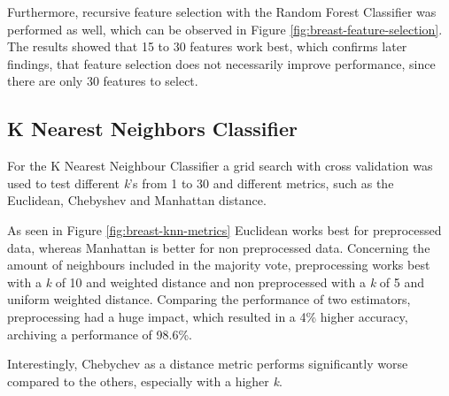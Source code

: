 

Furthermore, recursive feature selection with the Random Forest Classifier was performed as well, which can be observed in Figure \ref{fig:breast-feature-selection}. The results showed that 15 to 30 features work best, which confirms later findings, that feature selection does not necessarily improve performance, since there are only 30 features to select.


\subsection{K Nearest Neighbors Classifier}

For the K Nearest Neighbour Classifier a grid search with cross validation was used to test different \textit{k}'s from 1 to 30 and different metrics, such as the Euclidean, Chebyshev and Manhattan distance.

As seen in Figure \ref{fig:breast-knn-metrics} Euclidean works best for preprocessed data, whereas Manhattan is better for non preprocessed data.
Concerning the amount of neighbours included in the majority vote, preprocessing works best with a \textit{k} of 10 and weighted distance and non preprocessed with a \textit{k} of 5 and uniform weighted distance.
Comparing the performance of two estimators, preprocessing had a huge impact, which resulted in a 4\% higher accuracy, archiving a performance of 98.6\%.  

Interestingly, Chebychev as a distance metric performs significantly worse compared to the others, especially with a higher \textit{k}.

